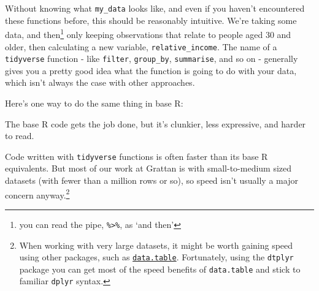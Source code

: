 \documentclass[]{book}
\newenvironment{Shaded}{\begin{snugshade}}{\end{snugshade}}
\newcommand{\DataTypeTok}[1]{\textcolor[rgb]{0.13,0.29,0.53}{#1}}
\newcommand{\DecValTok}[1]{\textcolor[rgb]{0.00,0.00,0.81}{#1}}
\newcommand{\KeywordTok}[1]{\textcolor[rgb]{0.13,0.29,0.53}{\textbf{#1}}}
\newcommand{\NormalTok}[1]{#1}
\newcommand{\OperatorTok}[1]{\textcolor[rgb]{0.81,0.36,0.00}{\textbf{#1}}}
\newcommand{\StringTok}[1]{\textcolor[rgb]{0.31,0.60,0.02}{#1}}
\begin{document}
\begin{Shaded}
\end{Shaded}

Without knowing what \texttt{my\_data} looks like, and even if you haven't encountered these functions before, this should be reasonably intuitive. We're taking some data, and then\footnote{you can read the pipe, \texttt{\%\textgreater{}\%}, as `and then'} only keeping observations that relate to people aged 30 and older, then calculating a new variable, \texttt{relative\_income}. The name of a \texttt{tidyverse} function - like \texttt{filter}, \texttt{group\_by}, \texttt{summarise}, and so on - generally gives you a pretty good idea what the function is going to do with your data, which isn't always the case with other approaches.

Here's one way to do the same thing in base R:

\begin{Shaded}
\end{Shaded}

The base R code gets the job done, but it's clunkier, less expressive, and harder to read.

Code written with \texttt{tidyverse} functions is often faster than its base R equivalents. But most of our work at Grattan is with small-to-medium sized datasets (with fewer than a million rows or so), so speed isn't usually a major concern anyway.\footnote{When working with very large datasets, it might be worth gaining speed using other packages, such as \href{https://cran.r-project.org/web/packages/data.table/vignettes/datatable-intro.html}{\texttt{data.table}}. Fortunately, using the \texttt{dtplyr} package you can get most of the speed benefits of \texttt{data.table} and stick to familiar \texttt{dplyr} syntax.}
\end{document}
